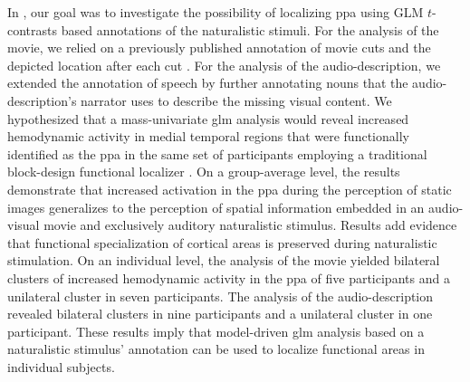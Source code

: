 In \citet{haeusler2022processing}, our goal was to investigate the possibility
of localizing \ac{ppa} using GLM $t$-contrasts based annotations of the
naturalistic stimuli.
For the analysis of the movie, we relied on a previously published annotation of
movie cuts and the depicted location after each cut \citep{haeusler2016cutanno}.
For the analysis of the audio-description, we extended the annotation of speech
by further annotating nouns that the audio-description's narrator uses to
describe the missing visual content.
We hypothesized that a mass-univariate \ac{glm} analysis would reveal increased
hemodynamic activity in medial temporal regions that were functionally
identified as the \ac{ppa} in the same set of participants employing a
traditional block-design functional localizer \citep{sengupta2016extension}.
On a group-average level, the results demonstrate that increased activation in
the \ac{ppa} during the perception of static images generalizes to the
perception of spatial information embedded in an audio-visual movie and
exclusively auditory naturalistic stimulus.
Results add evidence \citep[cf.][]{bartels2004mapping} that functional
specialization of cortical areas is preserved during naturalistic stimulation.
On an individual level, the analysis of the movie yielded bilateral clusters of
increased hemodynamic activity in the \ac{ppa} of five participants and a
unilateral cluster in seven participants.
%
The analysis of the audio-description revealed bilateral clusters in nine
participants and a unilateral cluster in one participant.
%
These results imply that model-driven \ac{glm} analysis based on a naturalistic
stimulus' annotation can be used to localize functional areas in individual
subjects.

